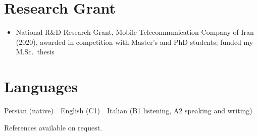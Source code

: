 \documentclass[10pt, a4paper]{article}
\begin{document}
\section{Research Grant}

\begin{itemize}
  \item National R\&D Research Grant, Mobile Telecommunication Company of Iran (2020), awarded in competition with Master's and PhD students; funded my M.Sc.\ thesis
\end{itemize}

\section{Languages}

Persian (native) \,\textperiodcentered\, English (C1) \,\textperiodcentered\, Italian (B1 listening, A2 speaking and writing)

\vspace{6pt}
{\footnotesize\color{midtext}References available on request.}
\end{document}
